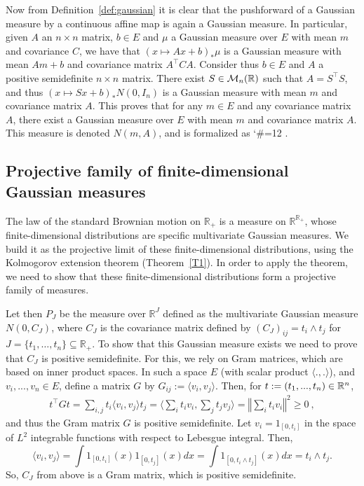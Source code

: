 \documentclass[lean]{Draft}
\makeatletter
\newcommand\leanlink{\begingroup\catcode`\#=12\relax\@leanlink}
\newcommand\@leanlink[2]{\endgroup
\href{#1}
{\texttt{\detokenize{#2}}}}
\newcommand{\docs}[1]{%
\leanlink{https://leanprover-community.github.io/mathlib4_docs/find/?pattern=#1\#doc}
{#1}}
\makeatother
\begin{document}
Now from Definition~\ref{def:gaussian} it is clear that the pushforward of a Gaussian measure by a continuous affine map is again a Gaussian measure. In particular, given $A$ an $n \times n$ matrix, $b \in E$ and $\mu$ a Gaussian measure over $E$ with mean $m$ and covariance $C$, we have that $(x \mapsto Ax + b)_* \mu$ is a Gaussian measure with mean $Am + b$ and covariance matrix $A^\top C A$.
Consider thus $b \in E$ and $A$ a positive semidefinite $n \times n$ matrix.
There exist $S \in \mathcal{M}_n(\mathbb{R})$ such that $A = S^\top S$, and thus $(x \mapsto Sx + b)_* N(0, I_n)$ is a Gaussian measure with mean $m$ and covariance matrix $A$. This proves that for any $m \in E$ and any covariance matrix $A$, there exist a Gaussian measure over $E$ with mean $m$ and covariance matrix $A$. This measure is denoted $N(m, A)$, and is formalized as \docs{ProbabilityTheory.multivariateGaussian}.



\subsection{Projective family of finite-dimensional Gaussian measures}

The law of the standard Brownian motion on $\mathbb{R}_+$ is a measure on $\mathbb{R}^{\mathbb{R}_+}$, whose finite-dimensional distributions are specific multivariate Gaussian measures.
We build it as the projective limit of these finite-dimensional distributions, using the Kolmogorov extension theorem (Theorem~\ref{T1}).
In order to apply the theorem, we need to show that these finite-dimensional distributions form a projective family of measures.

Let then $P_J$ be the measure over $\mathbb{R}^J$ defined as the multivariate Gaussian measure $N(0, C_J)$, where $C_J$ is the covariance matrix defined by $(C_J)_{ij} = t_i \wedge t_j$ for $J = \{t_1, \dots, t_n\} \subseteq \mathbb{R}_+$.
To show that this Gaussian measure exists we need to prove that $C_J$ is positive semidefinite.
For this, we rely on Gram matrices, which are based on inner product spaces. In such a space $E$ (with scalar product $\langle .,. \rangle$), and $v_i,...,v_n \in E$, define a matrix $G$ by $G_{ij} := \langle v_i, v_j\rangle$.
Then, for $t :=(t_1,...,t_n) \in \mathbb{R}^n$,
\begin{align*}
  t^\top G t = \sum_{i,j} t_i \langle v_i, v_j\rangle t_j = \Big\langle \sum_i t_i v_i, \sum_j t_j v_j\Big\rangle = \left\Vert \sum_i t_i v_i \right\Vert^2 \geq 0
  \: ,
\end{align*}
and thus the Gram matrix $G$ is positive semidefinite.
Let $v_i = 1_{[0,t_i]}$ in the space of $L^2$ integrable functions with respect to Lebesgue integral. Then,
$$ \langle v_i, v_j \rangle = \int 1_{[0,t_i]}(x) 1_{[0,t_j]}(x) dx = \int 1_{[0,t_i \wedge t_j]}(x) dx = t_i \wedge t_j.$$
So, $C_J$ from above is a Gram matrix, which is positive semidefinite.
\end{document}
